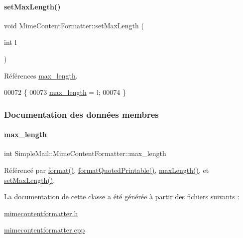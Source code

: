 \paragraph{\texorpdfstring{set\+Max\+Length()}{setMaxLength()}}
{\footnotesize\ttfamily void Mime\+Content\+Formatter\+::set\+Max\+Length (\begin{DoxyParamCaption}\item[{int}]{l }\end{DoxyParamCaption})}



Références \hyperlink{class_simple_mail_1_1_mime_content_formatter_a5c7278fb3bd794bc4ff408169cfef6fd}{max\+\_\+length}.


\begin{DoxyCode}
00072 \{
00073     \hyperlink{class_simple_mail_1_1_mime_content_formatter_a5c7278fb3bd794bc4ff408169cfef6fd}{max\_length} = l;
00074 \}
\end{DoxyCode}


\subsubsection{Documentation des données membres}
\mbox{\label{class_simple_mail_1_1_mime_content_formatter_a5c7278fb3bd794bc4ff408169cfef6fd}} 
\paragraph{\texorpdfstring{max\+\_\+length}{max\_length}}
{\footnotesize\ttfamily int Simple\+Mail\+::\+Mime\+Content\+Formatter\+::max\+\_\+length\hspace{0.3cm}{\ttfamily [protected]}}



Référencé par \hyperlink{class_simple_mail_1_1_mime_content_formatter_ac36a08fb6878efb0a6450170ebfc8766}{format()}, \hyperlink{class_simple_mail_1_1_mime_content_formatter_ae1f9eff05be2538bf6b3210fbab4b75a}{format\+Quoted\+Printable()}, \hyperlink{class_simple_mail_1_1_mime_content_formatter_a47f6976ee76be112da5dd610c7862d4b}{max\+Length()}, et \hyperlink{class_simple_mail_1_1_mime_content_formatter_af982d5e4c2fd25d72ef45a3b69f99593}{set\+Max\+Length()}.



La documentation de cette classe a été générée à partir des fichiers suivants \+:\begin{DoxyCompactItemize}
\item 
\hyperlink{mimecontentformatter_8h}{mimecontentformatter.\+h}\item 
\hyperlink{mimecontentformatter_8cpp}{mimecontentformatter.\+cpp}\end{DoxyCompactItemize}
